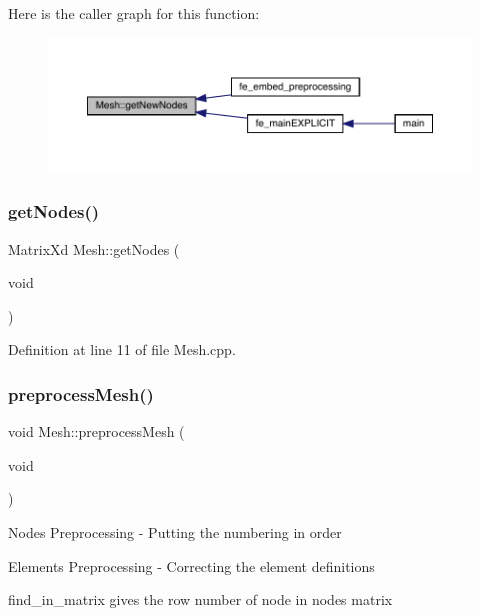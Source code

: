 Here is the caller graph for this function\+:
\nopagebreak
\begin{figure}[H]
\begin{center}
\leavevmode
\includegraphics[width=350pt]{class_mesh_a52ecce406bbef80cbf3610db3ea5ea40_icgraph}
\end{center}
\end{figure}
\mbox{\label{class_mesh_a0b0f7458f07745240d9bda967cda12de}} 
\subsubsection{\texorpdfstring{get\+Nodes()}{getNodes()}}
{\footnotesize\ttfamily Matrix\+Xd Mesh\+::get\+Nodes (\begin{DoxyParamCaption}\item[{void}]{ }\end{DoxyParamCaption})}



Definition at line 11 of file Mesh.\+cpp.

\mbox{\label{class_mesh_aa8a6f260e9589be4c0a2fcc146e696d5}} 
\subsubsection{\texorpdfstring{preprocess\+Mesh()}{preprocessMesh()}}
{\footnotesize\ttfamily void Mesh\+::preprocess\+Mesh (\begin{DoxyParamCaption}\item[{void}]{ }\end{DoxyParamCaption})}

Nodes Preprocessing -\/ Putting the numbering in order

Elements Preprocessing -\/ Correcting the element definitions

find\+\_\+in\+\_\+matrix gives the row number of node in nodes matrix 

